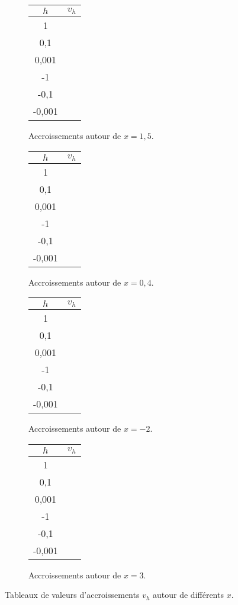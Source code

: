 \begin{figure}[h!]
	\begin{subfigure}{0.2\textwidth}
	\begin{tabular}{|c|c|}\hline
		$h$ & $v_h$ \\ \hline
		1 & \hspace{1cm} \\ \hline
		0,1 & \\ \hline
		0,001 & \\ \hline
		-1 & \\ \hline
		-0,1 & \\ \hline
		-0,001 & \\ \hline
	\end{tabular}
	\caption{Accroissements autour de $x=1,5$.}
	\label{fig:1e}
	\end{subfigure}
	\hfill
	\begin{subfigure}{0.2\textwidth}
	\begin{tabular}{|c|c|}\hline
		$h$ & $v_h$ \\ \hline
		1 & \hspace{1cm} \\ \hline
		0,1 & \\ \hline
		0,001 & \\ \hline
		-1 & \\ \hline
		-0,1 & \\ \hline
		-0,001 & \\ \hline
	\end{tabular}
	\caption{Accroissements autour de $x=0,4$.}
	\label{fig:1f}
	\end{subfigure}
	\hfill
	\begin{subfigure}{0.2\textwidth}
	\begin{tabular}{|c|c|}\hline
		$h$ & $v_h$ \\ \hline
		1 & \hspace{1cm} \\ \hline
		0,1 & \\ \hline
		0,001 & \\ \hline
		-1 & \\ \hline
		-0,1 & \\ \hline
		-0,001 & \\ \hline
	\end{tabular}
	\caption{Accroissements autour de $x=-2$.}
	\label{fig:1g}
	\end{subfigure}
	\hfill
	\begin{subfigure}{0.2\textwidth}
	\begin{tabular}{|c|c|}\hline
		$h$ & $v_h$ \\ \hline
		1 & \hspace{1cm} \\ \hline
		0,1 & \\ \hline
		0,001 & \\ \hline
		-1 & \\ \hline
		-0,1 & \\ \hline
		-0,001 & \\ \hline
	\end{tabular}
	\caption{Accroissements autour de $x=3$.}
	\label{fig:h}
	\end{subfigure}
	\caption{Tableaux de valeurs d'accroissements $v_h$ autour de différents $x$.}
	\label{fig:vh}
\end{figure}



